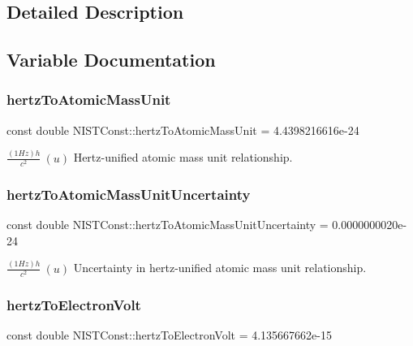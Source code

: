 \subsection{Detailed Description}


\subsection{Variable Documentation}
\mbox{\label{group___hertz_ga5e2fd7ea13ae13a34435ff0578082d34}} 
\subsubsection{\texorpdfstring{hertz\+To\+Atomic\+Mass\+Unit}{hertzToAtomicMassUnit}}
{\footnotesize\ttfamily const double N\+I\+S\+T\+Const\+::hertz\+To\+Atomic\+Mass\+Unit = 4.\+4398216616e-\/24}

$\frac{(1 Hz)h}{c^2} \ (u)$ Hertz-\/unified atomic mass unit relationship. \mbox{\label{group___hertz_ga7ec0e57b96db2ded3c361465c8770d71}} 
\subsubsection{\texorpdfstring{hertz\+To\+Atomic\+Mass\+Unit\+Uncertainty}{hertzToAtomicMassUnitUncertainty}}
{\footnotesize\ttfamily const double N\+I\+S\+T\+Const\+::hertz\+To\+Atomic\+Mass\+Unit\+Uncertainty = 0.\+0000000020e-\/24}

$\frac{(1 Hz)h}{c^2} \ (u)$ Uncertainty in hertz-\/unified atomic mass unit relationship. \mbox{\label{group___hertz_ga035f43de5d8ad8208675c53a0057d14d}} 
\subsubsection{\texorpdfstring{hertz\+To\+Electron\+Volt}{hertzToElectronVolt}}
{\footnotesize\ttfamily const double N\+I\+S\+T\+Const\+::hertz\+To\+Electron\+Volt = 4.\+135667662e-\/15}


